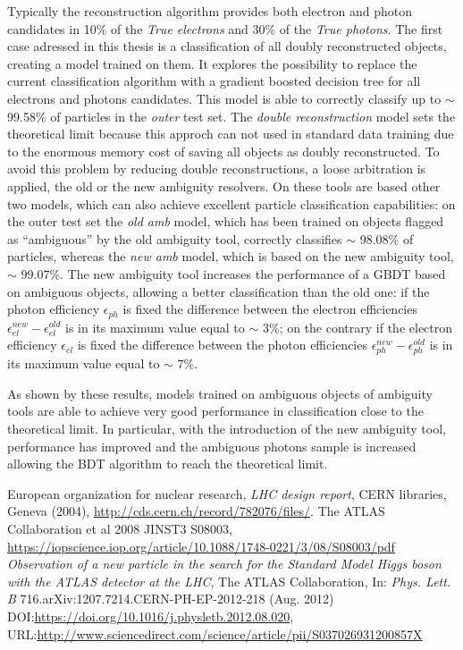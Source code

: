 \documentclass[a4paper, oneside, 11pt]{book}
\begin{document}
	Typically the reconstruction algorithm provides both electron and photon candidates in 10\% of the \textit{True electrons} and 30\% of the \textit{True photons}. The first case adressed in this thesis is a classification of all doubly reconstructed objects, creating a model trained on them. It explores the possibility to replace the current classification algorithm with a gradient boosted decision tree for all electrons and photons candidates. This model is able to correctly classify up to $\sim$ 99.58\% of particles in the \textit{outer} test set. The \textit{double reconstruction} model sets the theoretical limit because this approch can not used in standard data training due to the enormous memory cost of saving all objects as doubly reconstructed. To avoid this problem by reducing double reconstructions, a loose arbitration is applied, the old or the new ambiguity resolvers. On these tools are based other two models, which can also achieve excellent particle classification capabilities: on the outer test set the \textit{old amb} model, which has been trained on objects flagged as “ambiguous” by the old ambiguity tool, correctly classifies $\sim$ 98.08\% of particles, whereas the \textit{new amb} model,  which is based on the new ambiguity tool, $\sim$ 99.07\%. The new ambiguity tool  increases the performance of a GBDT based on ambiguous objects, allowing a better classification than the old one: if the photon efficiency $\epsilon_{ph}$ is fixed the difference between the electron efficiencies $\epsilon_{el}^{new} - \epsilon_{el}^{old}$ is in its maximum value equal to $\sim$ 3\%; on the contrary if the electron efficiency $\epsilon_{el}$ is fixed the difference between the photon efficiencies $\epsilon_{ph}^{new} - \epsilon_{ph}^{old}$ is in its maximum value equal to $\sim$ 7\%.

	As shown by these results, models trained on ambiguous objects of ambiguity tools are able to achieve very good performance in classification close to the theoretical limit. In particular, with the introduction of the new ambiguity tool, performance has improved and the ambiguous photons sample is increased allowing the BDT algorithm to reach the theoretical limit.
	
	
	\begin{thebibliography}{3}
		European organization for nuclear research, \textit{LHC design report}, CERN libraries, Geneva (2004), \url{http://cds.cern.ch/record/782076/files/}.
		The ATLAS Collaboration et al 2008 JINST3 S08003,
		\url{https://iopscience.iop.org/article/10.1088/1748-0221/3/08/S08003/pdf}
		\textit{Observation of a new particle in the search for the Standard Model Higgs boson with the ATLAS detector at the LHC},
		The ATLAS Collaboration, In: \textit{Phys. Lett. B} 716.arXiv:1207.7214.CERN-PH-EP-2012-218 (Aug. 2012) DOI:\url{https://doi.org/10.1016/j.physletb.2012.08.020}, URL:\url{http://www.sciencedirect.com/science/article/pii/S037026931200857X}
	\end{thebibliography}
	
\end{document}

